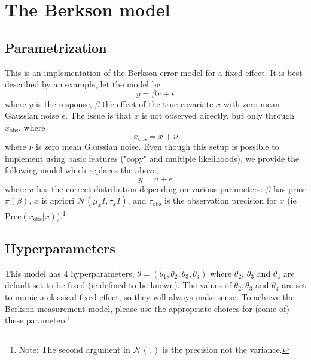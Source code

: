 \documentclass[a4paper,11pt]{article}
\begin{document}
\section*{The Berkson model}

\subsection*{Parametrization}

This is an implementation of the Berkson error model for a fixed
effect. It is best described by an example, let  the model be
\begin{displaymath}
    y = \beta x + \epsilon{}
\end{displaymath}
where $y$ is the response, $\beta$ the effect of the true covariate
$x$ with zero mean Gaussian noise $\epsilon$. The issue is that $x$ is not observed
directly, but only through $x_{\text{obs}}$, where
\begin{displaymath}
    x_{\text{obs}} = x + \nu{}
\end{displaymath}
where $\nu$ is zero mean Gaussian noise. Even though this setup is
possible to implement using basic features ("copy" and multiple
likelihoods), we provide the following model which replaces the above,
\begin{displaymath}
    y = u + \epsilon{}
\end{displaymath}
where $u$ has the correct distribution depending on various parameters:
$\beta$ has prior $\pi(\beta)$, $x$ is apriori ${\mathcal N}(\mu_{x}
{I}, \tau_{x} {I})$, and $\tau_{\text{obs}}$ is the observation
precision for $x$ (ie $\text{Prec}(x_{\text{obs}}|x)$).\footnote{Note:
    The second argument in ${\mathcal N}(,)$ is the precision not the
    variance.}



\subsection*{Hyperparameters}

This model has 4 hyperparameters, $\theta = (\theta_{1}, \theta_{2},
\theta_{3}, \theta_{4})$ where $\theta_{2}$, $\theta_{3}$ and
$\theta_{4}$ are default set to be fixed (ie defined to be known). The
values of $\theta_{2}, \theta_{3}$ and $\theta_{4}$ are set to mimic a
classical fixed effect, so they will always make sense. To achieve the
Berkson measurement model, please use the appropriate choices for
(some of) these parameters!
\end{document}
